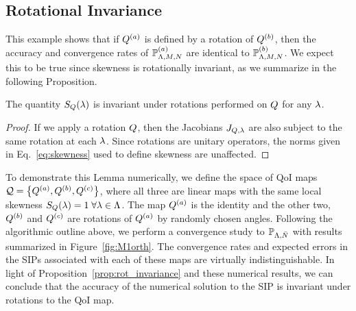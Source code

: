 \subsection{Rotational Invariance}\label{ex:rotation}
This example shows that if $Q^{(a)}$ is defined by a rotation of $Q^{(b)}$, then the accuracy and convergence rates of $\mathbb{P}^{(a)}_{{\Lambda}, M, N}$ are identical to $\mathbb{P}^{(b)}_{{\Lambda}, M, N}$.
We expect this to be true since skewness is rotationally invariant, as we summarize in the following Proposition.
\begin{prop}
The quantity $S_Q(\lambda)$ is invariant under rotations performed on $Q$ for any $\lambda$. \\
\label{prop:rot_invariance}
\end{prop}
\begin{proof}
If we apply a rotation $Q$, then the Jacobians $J_{Q, \lambda}$ are also subject to the same rotation at each $\lambda$.
Since rotations are unitary operators, the norms given in Eq.~\eqref{eq:skewness} used to define skewness are unaffected.
\end{proof}

To demonstrate this Lemma numerically, we define the space of QoI maps $\mathcal{Q} = \left\{ Q^{(a)} , Q^{(b)}, Q^{(c)} \right\}$, where all three are linear maps with the same local skewness $S_Q (\lambda) = 1 \; \forall \lambda \in {\Lambda}$.
The map $Q^{(a)}$ is the identity and the other two, $Q^{(b)}$ and $Q^{(c)}$ are rotations of $Q^{(a)}$ by randomly chosen angles.
Following the algorithmic outline above, we perform a convergence study to $\mathbb{P}_{{\Lambda},\bar{N}}$ with results summarized in Figure~\ref{fig:M1orth}.
The convergence rates and expected errors in the SIPs associated with each of these maps are virtually indistinguishable.
In light of Proposition~\ref{prop:rot_invariance} and these numerical results, we can conclude that the accuracy of the numerical solution to the SIP is invariant under rotations to the QoI map.

